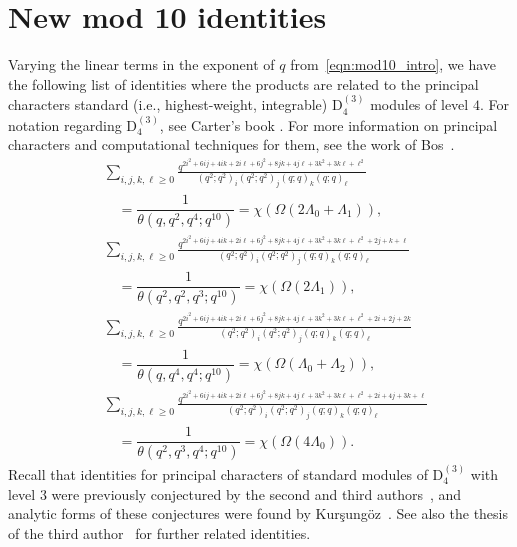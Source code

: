 \documentclass[10pt]{article}
\begin{document}
\setcounter{section}{5}
\setcounter{equation}{78}
\section{New mod 10 identities}
\label{sec:mod10}

Varying the linear terms in the exponent of $q$ from~\eqref{eqn:mod10_intro}, we have the following list of identities where the products are related to the
principal characters standard (i.e., highest-weight, integrable) $\mathrm{D}_4^{(3)}$ modules of level $4$.
For notation regarding $\mathrm{D}_4^{(3)}$, see Carter's book \cite[P.\ 608]{Car-book}. 
For more information on principal characters and computational techniques for them, see the work of Bos~\cite{Bos}.
\begin{align}
&\sum_{i,j,k,\ell \ge 0}
\frac{q^{2i^2 + 6 ij + 4ik + 2i\ell + 6j^2 + 8 jk + 4 j\ell + 3k^2+3k\ell+\ell^2}}
{\left(q^2;q^2\right)_i\left(q^2;q^2\right)_j\left(q;q\right)_k\left(q;q\right)_\ell}\nonumber\\
&\quad=
\dfrac{1}{\theta(q,q^2,q^4;q^{10})} 
=\chi(\Omega(2\Lambda_0+\Lambda_1)),
\label{eq:mod10A}
\\
&\sum_{i,j,k,\ell \ge 0}
\frac{q^{2i^2 + 6 ij + 4ik + 2i\ell + 6j^2 + 8 jk + 4 j\ell + 3k^2+3k\ell+\ell^2+2j+k+\ell}}
{\left(q^2;q^2\right)_i\left(q^2;q^2\right)_j\left(q;q\right)_k\left(q;q\right)_\ell}
\nonumber\\ 
&\quad=
\dfrac{1}{\theta(q^2,q^2,q^3;q^{10})}  
=\chi(\Omega(2\Lambda_1)),
\\
&\sum_{i,j,k,\ell \ge 0}
\frac{q^{2i^2 + 6 ij + 4ik + 2i\ell + 6j^2 + 8 jk + 4 j\ell + 3k^2+3k\ell+\ell^2+2i+2j+2k}}
{\left(q^2;q^2\right)_i\left(q^2;q^2\right)_j\left(q;q\right)_k\left(q;q\right)_\ell}
\nonumber\\ 
&\quad= 
\dfrac{1}{\theta(q,q^4,q^4;q^{10})}  
=\chi(\Omega(\Lambda_0+\Lambda_2)),
\\
&\sum_{i,j,k,\ell \ge 0}
\frac{q^{2i^2 + 6 ij + 4ik + 2i\ell + 6j^2 + 8 jk + 4 j\ell + 3k^2+3k\ell+\ell^2+2i+4j+3k+\ell}}
{\left(q^2;q^2\right)_i\left(q^2;q^2\right)_j\left(q;q\right)_k\left(q;q\right)_\ell}
\nonumber\\ 
&\quad=
\dfrac{1}{\theta(q^2,q^3,q^4;q^{10})}   
= \chi(\Omega(4\Lambda_0)). \label{eq:mod10D}
\end{align}
Recall that  identities for principal characters of  standard modules
of $\mathrm{D}_4^{(3)}$ with level $3$ were previously conjectured by the second and third authors~\cite{KanRus-idf}, and
analytic forms of these conjectures were found by Kur\c{s}ung\"{o}z~\cite{Kur-KR}. See also the thesis of the third author~\cite{Rus-thesis} for further
related identities.
\end{document}
